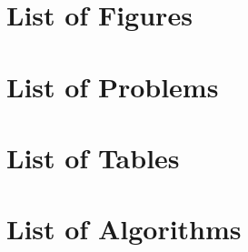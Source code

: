 

\appendix

\renewcommand{\sectionmark}[1]{}
\renewcommand{\leftmark}{appendix}
\renewcommand{\rightmark}{appendix}

{}	%
{}	%

%

\pagestyle{plain}

\pagestyle{scrheadings}

{
\section{List of Figures}
\clearpage
\section{List of Problems}
\section{List of Tables}
\section{List of Algorithms}
\clearpage

}


